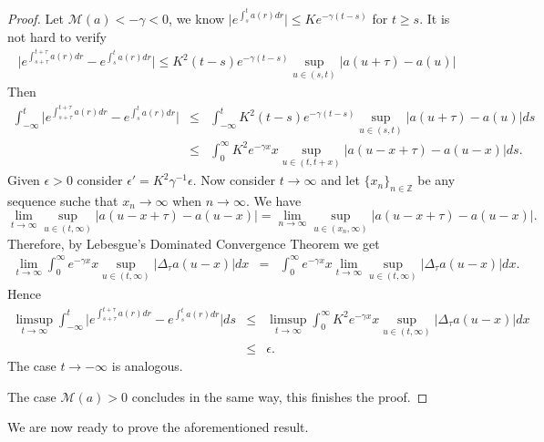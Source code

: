 \documentclass[english,,reqno]{amsart}
\numberwithin{equation}{section}
\newcommand{\bb}[1]{\mathbb{#1}}
\theoremstyle{plain}
\theoremstyle{definition}
\theoremstyle{remark}
\begin{document}
\begin{proof}
Let $\mathcal{M}(a)<-\gamma<0$, we know $\vert e^{\int_{s}^{t}a(r)dr}\vert\leq Ke^{-\gamma(t-s)}$ for $t\geq s$.
It is not hard to verify
\begin{eqnarray*}
\vert e^{\int_{s+\tau}^{t+\tau}a(r)dr}-e^{\int_{s}^{t}a(r)dr}\vert\leq K^{2} (t-s) e^{-\gamma(t-s)}\sup_{u\in (s,t)}\vert a(u+\tau)-a(u)\vert
\end{eqnarray*}
Then
\begin{eqnarray*}
\int_{-\infty}^{t} \vert e^{\int_{s+\tau}^{t+\tau}a(r)dr}-e^{\int_{s}^{t}a(r)dr}\vert
&\leq& \int_{-\infty}^{t} K^{2} (t-s) e^{-\gamma(t-s)}\sup_{u\in (s,t)}\vert a(u+\tau)-a(u)\vert ds\\
&\leq & \int_{0}^{\infty} K^{2} e^{-\gamma x}x\sup_{u\in (t,t+x)}\vert a(u-x+\tau)-a(u-x)\vert ds.
\end{eqnarray*}
Given $\epsilon>0$ consider $\epsilon'=K^{2}\gamma^{-1}\epsilon$. 
Now consider $t\rightarrow\infty$ and let $\{ x_n\}_{n\in\bb{Z}}$ be any sequence suche that $x_n\rightarrow\infty$ when $n\rightarrow\infty$. We have
$$\lim_{t\rightarrow\infty} \sup_{u\in(t,\infty)}\vert a(u-x+\tau)-a(u-x)\vert =\lim_{n\rightarrow\infty} \sup_{u\in(x_n,\infty)}\vert a(u-x+\tau)-a(u-x)\vert.$$
Therefore, by Lebesgue's Dominated Convergence Theorem we get
\begin{eqnarray*}
\lim_{t\rightarrow\infty}\int_{0}^{\infty}e^{-\gamma x}x\sup_{u\in(t,\infty)}\vert \Delta_{\tau} a(u-x)\vert dx 
	&=&	\int_{0}^{\infty}e^{-\gamma x}x\lim_{t\rightarrow\infty}\sup_{u\in(t,\infty)}\vert \Delta_{\tau} a(u-x)\vert dx.
\end{eqnarray*}
Hence
\begin{eqnarray*}
\limsup_{t\rightarrow\infty}
\int_{-\infty}^{t} \vert e^{\int_{s+\tau}^{t+\tau}a(r)dr}-e^{\int_{s}^{t}a(r)dr}\vert ds
&\leq & \limsup_{t\rightarrow\infty} \int_{0}^{\infty} K^{2} e^{-\gamma x}x\sup_{u\in (t,\infty)}\vert \Delta_{\tau} a(u-x)\vert dx\\
&\leq & \epsilon.
\end{eqnarray*}
The case $t\rightarrow -\infty$ is analogous.

The case $\mathcal{M}(a)>0$ concludes in the same way, this finishes the proof.
\end{proof}

We are now ready to prove the aforementioned result. 
\end{document}
